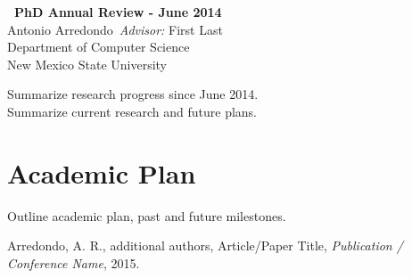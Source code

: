 \documentclass[11pt,letterpaper]{article}
\newcommand{\StudentName}{Antonio Arredondo}
\newcommand{\AdvisorName}{First Last}
\newcommand{\DeptName}{Department of Computer Science}
\newcommand{\UniName}{New Mexico State University}
\newcommand{\PubStudentName}{Arredondo, A. R.}
\newcommand{\FromMonthYear}{June 2014}
\begin{document}
\begin{center}
  \Large{\textbf{\the\year\ PhD Annual Review - \FromMonthYear}} \\
  \large{
    \StudentName\ \emph{Advisor:} \AdvisorName \\
    \DeptName \\
    \UniName \\
  }
\end{center}

\noindent Summarize research progress since \FromMonthYear.
\\

\noindent Summarize current research and future plans.

\section*{Academic Plan}

Outline academic plan, past and future milestones.

\begin{thebibliography}{9}

  \PubStudentName, additional authors,
  Article/Paper Title,
  \emph{Publication / Conference Name},
  2015.

\end{thebibliography}
\end{document}

